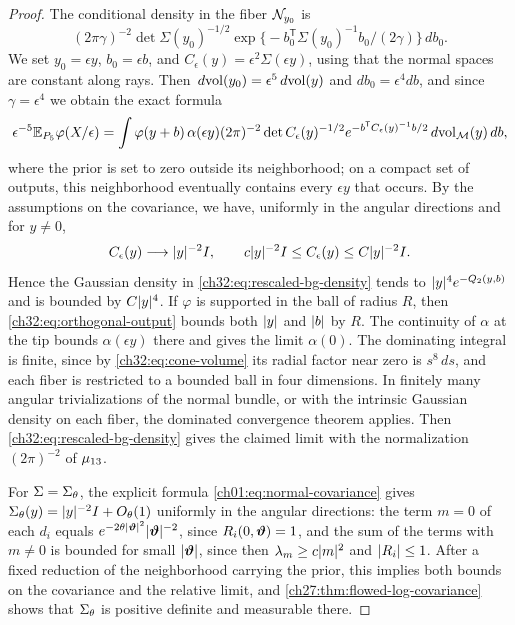 \begin{proof}
The conditional density in the fiber $\mathcal N_{y_0}$ is
\[
 (2\pi\gamma)^{-2}\det\Sigma(y_0)^{-1/2}\exp\bigl\{-b_0^{\mathsf T}\Sigma(y_0)^{-1}b_0/(2\gamma)\bigr\}\,db_0.
\]
We set $y_0=\epsilon y$, $b_0=\epsilon b$, and $C_\epsilon(y)=\epsilon^2\Sigma(\epsilon y)$, using that the normal spaces are constant along rays. Then $\,d\mathrm{vol}(y_0)=\epsilon^5\,d\mathrm{vol}(y)$ and $db_0=\epsilon^4db$, and since $\gamma=\epsilon^4$ we obtain the exact formula
\begin{equation}\label{ch32:eq:rescaled-bg-density}
 \epsilon^{-5}\mathbb E_{P_5}\varphi(X/\epsilon)=\int\varphi(y+b)\,\alpha(\epsilon y)(2\pi)^{-2}\det C_\epsilon(y)^{-1/2}e^{-b^{\mathsf T}C_\epsilon(y)^{-1}b/2}\,d\mathrm{vol}_{\mathcal M}(y)\,db,
\end{equation}
where the prior is set to zero outside its neighborhood; on a compact set of outputs, this neighborhood eventually contains every $\epsilon y$ that occurs. By the assumptions on the covariance, we have, uniformly in the angular directions and for $y\ne0$,
\[
 C_\epsilon(y)\longrightarrow\lvert y\rvert^{-2}I,\qquad c\lvert y\rvert^{-2}I\le C_\epsilon(y)\le C\lvert y\rvert^{-2}I.
\]
Hence the Gaussian density in \eqref{ch32:eq:rescaled-bg-density} tends to $\lvert y\rvert^4e^{-Q_2(y,b)}$ and is bounded by $C\lvert y\rvert^4$. If $\varphi$ is supported in the ball of radius $R$, then \eqref{ch32:eq:orthogonal-output} bounds both $\lvert y\rvert$ and $\lvert b\rvert$ by $R$. The continuity of $\alpha$ at the tip bounds $\alpha(\epsilon y)$ there and gives the limit $\alpha(0)$. The dominating integral is finite, since by \eqref{ch32:eq:cone-volume} its radial factor near zero is $s^8\,ds$, and each fiber is restricted to a bounded ball in four dimensions. In finitely many angular trivializations of the normal bundle, or with the intrinsic Gaussian density on each fiber, the dominated convergence theorem applies. Then \eqref{ch32:eq:rescaled-bg-density} gives the claimed limit with the normalization $(2\pi)^{-2}$ of $\mu_{13}$.

For $\Sigma=\Sigma_\theta$, the explicit formula \eqref{ch01:eq:normal-covariance} gives $\Sigma_\theta(y)=\lvert y\rvert^{-2}I+O_\theta(1)$ uniformly in the angular directions: the term $m=0$ of each $d_i$ equals $e^{-2\theta\lvert \bm\vartheta\rvert^2}\lvert \bm\vartheta\rvert^{-2}$, since $R_i(0,\bm\vartheta)=1$, and the sum of the terms with $m\ne0$ is bounded for small $\lvert \bm\vartheta\rvert$, since then $\lambda_m\ge c\lvert m\rvert^2$ and $\lvert R_i\rvert\le1$. After a fixed reduction of the neighborhood carrying the prior, this implies both bounds on the covariance and the relative limit, and \cref{ch27:thm:flowed-log-covariance} shows that $\Sigma_\theta$ is positive definite and measurable there.


\end{proof}
